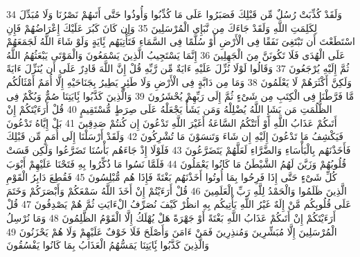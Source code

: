{\tiny\colorbox{cl_aya}{34}} وَلَقَدْ كُذِّبَتْ رُسُلٌ مِّن قَبْلِكَ فَصَبَرُوا عَلَى مَا كُذِّبُوا وَأُوذُوا حَتَّى أَتَىهُمْ نَصْرُنَا وَلَا مُبَدِّلَ لِكَلِمَتِ اللَّهِ وَلَقَدْ جَاءَكَ مِن نَّبَإِى الْمُرْسَلِينَ
{\tiny\colorbox{cl_aya}{35}} وَإِن كَانَ كَبُرَ عَلَيْكَ إِعْرَاضُهُمْ فَإِنِ اسْتَطَعْتَ أَن تَبْتَغِىَ نَفَقًا فِى الْأَرْضِ أَوْ سُلَّمًا فِى السَّمَاءِ فَتَأْتِيَهُم بَِٔايَةٍ وَلَوْ شَاءَ اللَّهُ لَجَمَعَهُمْ عَلَى الْهُدَى فَلَا تَكُونَنَّ مِنَ الْجَهِلِينَ
{\tiny\colorbox{cl_aya}{36}} إِنَّمَا يَسْتَجِيبُ الَّذِينَ يَسْمَعُونَ وَالْمَوْتَى يَبْعَثُهُمُ اللَّهُ ثُمَّ إِلَيْهِ يُرْجَعُونَ
{\tiny\colorbox{cl_aya}{37}} وَقَالُوا لَوْلَا نُزِّلَ عَلَيْهِ ءَايَةٌ مِّن رَّبِّهِ قُلْ إِنَّ اللَّهَ قَادِرٌ عَلَى أَن يُنَزِّلَ ءَايَةً وَلَكِنَّ أَكْثَرَهُمْ لَا يَعْلَمُونَ
{\tiny\colorbox{cl_aya}{38}} وَمَا مِن دَابَّةٍ فِى الْأَرْضِ وَلَا طَئِرٍ يَطِيرُ بِجَنَاحَيْهِ إِلَّا أُمَمٌ أَمْثَالُكُم مَّا فَرَّطْنَا فِى الْكِتَبِ مِن شَىْءٍ ثُمَّ إِلَى رَبِّهِمْ يُحْشَرُونَ
{\tiny\colorbox{cl_aya}{39}} وَالَّذِينَ كَذَّبُوا بَِٔايَتِنَا صُمٌّ وَبُكْمٌ فِى الظُّلُمَتِ مَن يَشَإِ اللَّهُ يُضْلِلْهُ وَمَن يَشَأْ يَجْعَلْهُ عَلَى صِرَطٍ مُّسْتَقِيمٍ
{\tiny\colorbox{cl_aya}{40}} قُلْ أَرَءَيْتَكُمْ إِنْ أَتَىكُمْ عَذَابُ اللَّهِ أَوْ أَتَتْكُمُ السَّاعَةُ أَغَيْرَ اللَّهِ تَدْعُونَ إِن كُنتُمْ صَدِقِينَ
{\tiny\colorbox{cl_aya}{41}} بَلْ إِيَّاهُ تَدْعُونَ فَيَكْشِفُ مَا تَدْعُونَ إِلَيْهِ إِن شَاءَ وَتَنسَوْنَ مَا تُشْرِكُونَ
{\tiny\colorbox{cl_aya}{42}} وَلَقَدْ أَرْسَلْنَا إِلَى أُمَمٍ مِّن قَبْلِكَ فَأَخَذْنَهُم بِالْبَأْسَاءِ وَالضَّرَّاءِ لَعَلَّهُمْ يَتَضَرَّعُونَ
{\tiny\colorbox{cl_aya}{43}} فَلَوْلَا إِذْ جَاءَهُم بَأْسُنَا تَضَرَّعُوا وَلَكِن قَسَتْ قُلُوبُهُمْ وَزَيَّنَ لَهُمُ الشَّيْطَنُ مَا كَانُوا يَعْمَلُونَ
{\tiny\colorbox{cl_aya}{44}} فَلَمَّا نَسُوا مَا ذُكِّرُوا بِهِ فَتَحْنَا عَلَيْهِمْ أَبْوَبَ كُلِّ شَىْءٍ حَتَّى إِذَا فَرِحُوا بِمَا أُوتُوا أَخَذْنَهُم بَغْتَةً فَإِذَا هُم مُّبْلِسُونَ
{\tiny\colorbox{cl_aya}{45}} فَقُطِعَ دَابِرُ الْقَوْمِ الَّذِينَ ظَلَمُوا وَالْحَمْدُ لِلَّهِ رَبِّ الْعَلَمِينَ
{\tiny\colorbox{cl_aya}{46}} قُلْ أَرَءَيْتُمْ إِنْ أَخَذَ اللَّهُ سَمْعَكُمْ وَأَبْصَرَكُمْ وَخَتَمَ عَلَى قُلُوبِكُم مَّنْ إِلَهٌ غَيْرُ اللَّهِ يَأْتِيكُم بِهِ انظُرْ كَيْفَ نُصَرِّفُ الْءَايَتِ ثُمَّ هُمْ يَصْدِفُونَ
{\tiny\colorbox{cl_aya}{47}} قُلْ أَرَءَيْتَكُمْ إِنْ أَتَىكُمْ عَذَابُ اللَّهِ بَغْتَةً أَوْ جَهْرَةً هَلْ يُهْلَكُ إِلَّا الْقَوْمُ الظَّلِمُونَ
{\tiny\colorbox{cl_aya}{48}} وَمَا نُرْسِلُ الْمُرْسَلِينَ إِلَّا مُبَشِّرِينَ وَمُنذِرِينَ فَمَنْ ءَامَنَ وَأَصْلَحَ فَلَا خَوْفٌ عَلَيْهِمْ وَلَا هُمْ يَحْزَنُونَ
{\tiny\colorbox{cl_aya}{49}} وَالَّذِينَ كَذَّبُوا بَِٔايَتِنَا يَمَسُّهُمُ الْعَذَابُ بِمَا كَانُوا يَفْسُقُونَ
